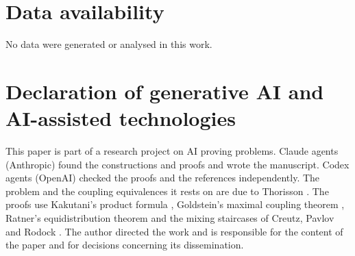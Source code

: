 \documentclass[11pt]{amsart}
\theoremstyle{definition}
\theoremstyle{remark}
\begin{document}
\section*{Data availability}
No data were generated or analysed in this work.

\section*{Declaration of generative AI and AI-assisted technologies}
This paper is part of a research project on AI proving problems. Claude agents (Anthropic) found the constructions and
proofs and wrote the manuscript. Codex agents (OpenAI) checked the
proofs and the references independently. The problem and the coupling equivalences it rests on are due to Thorisson \cite{Tho00,Tho11}. The proofs use Kakutani's product formula \cite{Kak48}, Goldstein's maximal coupling theorem \cite{Gol79}, Ratner's equidistribution theorem \cite{Rat91} and the mixing staircases of Creutz, Pavlov and Rodock \cite{CPR23}. The author
directed the work and is responsible for the content of the paper
and for decisions concerning its dissemination.
\end{document}
